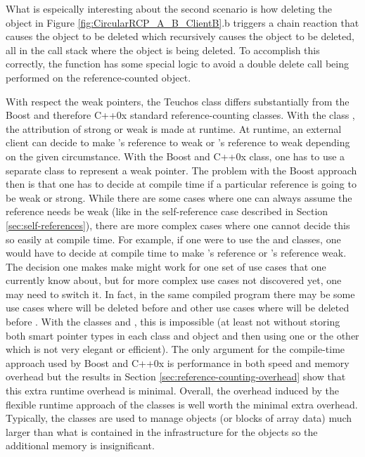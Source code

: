 \documentclass[pdf,ps2pdf,11pt]{SANDreport}
\begin{document}
What is espeically interesting about the second scenario is how
deleting the {} object in Figure
{}\ref{fig:CircularRCP_A_B_ClientB}.b triggers a chain reaction that
causes the {} object to be deleted which recursively causes
the {} object to be deleted, all in the call stack where
the {} object is being deleted.  To accomplish this
correctly, the {} function has some
special logic to avoid a double delete call being performed on the
reference-counted object.

With respect the weak pointers, the Teuchos class {} differs
substantially from the Boost and therefore C++0x standard
reference-counting classes.  With the class {}, the
attribution of strong or weak is made at runtime.  At runtime, an
external client can decide to make {}'s reference to {}
weak or {}'s reference to {} weak depending on the given
circumstance.  With the Boost and C++0x {} class, one
has to use a separate class {} to represent a weak
pointer.  The problem with the Boost approach then is that one has to
decide at compile time if a particular reference is going to be weak
or strong.  While there are some cases where one can always assume the
reference needs be weak (like in the self-reference case described in
Section {}\ref{sec:self-references}), there are more complex cases
where one cannot decide this so easily at compile time.  For example,
if one were to use the {} and {}
classes, one would have to decide at compile time to make {}'s
reference or {}'s reference weak.  The decision one makes make
might work for one set of use cases that one currently know about, but
for more complex use cases not discovered yet, one may need to switch
it.  In fact, in the same compiled program there may be some use cases
where {} will be deleted before {} and other use cases
where {} will be deleted before {}.  With the classes
{} and {}, this is impossible (at
least not without storing both smart pointer types in each class
{} and {} object and then using one or the other which
is not very elegant or efficient).  The only argument for the
compile-time approach used by Boost and C++0x is performance in both
speed and memory overhead but the results in Section
{}\ref{sec:reference-counting-overhead} show that this extra runtime
overhead is minimal.  Overall, the overhead induced by the flexible
runtime approach of the {} classes is well worth the
minimal extra overhead.  Typically, the classes {} are
used to manage objects (or blocks of array data) much larger than what
is contained in the infrastructure for the {} objects
so the additional memory is insignificant.
\end{document}

